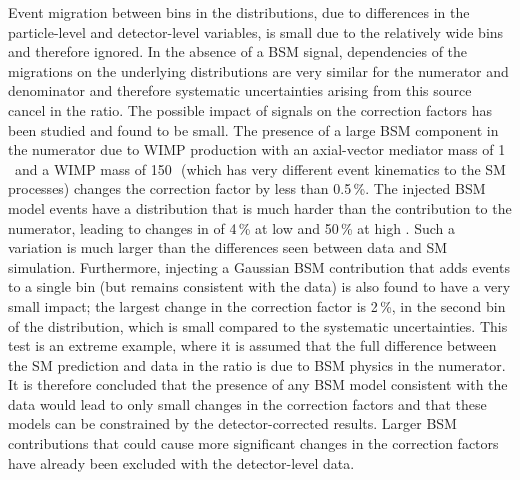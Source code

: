\documentclass[cernpreprint,txfonts,UKenglish,texlive=2016]{\ATLASLATEXPATH atlasdoc}
\begin{document}
Event migration between bins in the distributions, due to differences in the particle-level and
detector-level variables, is small due to the relatively
wide bins and therefore ignored. In the absence of a BSM signal, dependencies of the migrations on the
underlying distributions are very similar for the numerator and
denominator and therefore systematic uncertainties arising from this
source cancel in the ratio. 
The possible impact of signals on the correction factors has been studied and found to be small.
The presence of a large BSM component in the numerator due to WIMP production with an axial-vector mediator mass 
of 1\,\TeV\ and a WIMP mass of 150\,\GeV\ (which has very different event kinematics to the SM processes) 
changes the correction factor by less than 0.5\,\%.
The injected BSM model events have a
\ptmiss{} distribution that is much harder than the \Znunu{}
contribution to the numerator, leading to changes in \Rmiss{} of 
4\,\% at low \ptmiss{} and 50\,\% at high \ptmiss{}. Such a variation
is much larger than the differences seen between data and SM
simulation.
Furthermore, injecting a Gaussian BSM contribution 
that adds events to a single bin (but remains consistent with the
data) is also found to have a very small impact; the largest change in
the correction factor is 2\,\%, in the second bin of the
\ptmiss{} distribution, which is small compared to the systematic
uncertainties. 
This test is an extreme example, where it is assumed that the full
difference between the SM prediction and data in the \Rmiss{} ratio is 
due to BSM physics in the numerator. 
It is therefore concluded that the presence of any BSM model consistent
with the data would lead to only small changes in the correction
factors and that these models can be constrained by the detector-corrected 
results. Larger BSM contributions that could cause more significant 
changes in the correction factors have already been excluded with the detector-level data.
\end{document}
